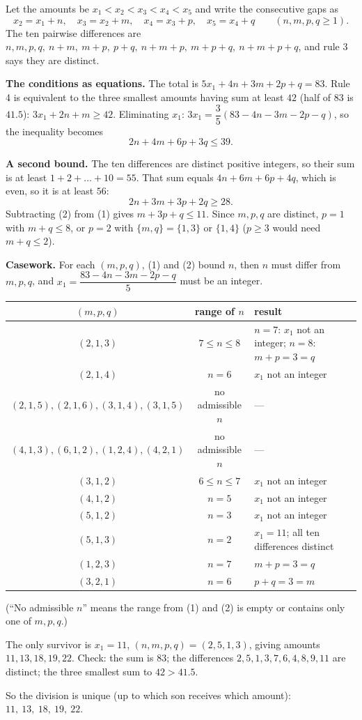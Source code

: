 Let the amounts be $x_1<x_2<x_3<x_4<x_5$ and write the consecutive gaps as
\[
x_2=x_1+n,\quad x_3=x_2+m,\quad x_4=x_3+p,\quad x_5=x_4+q\qquad(n,m,p,q\ge1).
\]
The ten pairwise differences are $n,m,p,q,\ n+m,\ m+p,\ p+q,\ n+m+p,\ m+p+q,\ n+m+p+q$, and rule 3 says they are distinct.

\textbf{The conditions as equations.} The total is $5x_1+4n+3m+2p+q=83$. Rule 4 is equivalent to the three smallest amounts having sum at least $42$ (half of $83$ is $41.5$): $3x_1+2n+m\ge42$. Eliminating $x_1$: $3x_1=\dfrac{3}{5}(83-4n-3m-2p-q)$, so the inequality becomes
\[
2n+4m+6p+3q\le39. \tag{1}
\]

\textbf{A second bound.} The ten differences are distinct positive integers, so their sum is at least $1+2+\dots+10=55$. That sum equals $4n+6m+6p+4q$, which is even, so it is at least $56$:
\[
2n+3m+3p+2q\ge28. \tag{2}
\]
Subtracting (2) from (1) gives $m+3p+q\le11$. Since $m,p,q$ are distinct, $p=1$ with $m+q\le8$, or $p=2$ with $\{m,q\}=\{1,3\}$ or $\{1,4\}$ ($p\ge3$ would need $m+q\le2$).

\textbf{Casework.} For each $(m,p,q)$, (1) and (2) bound $n$, then $n$ must differ from $m,p,q$, and $x_1=\dfrac{83-4n-3m-2p-q}{5}$ must be an integer.
\begin{center}
\begin{tabular}{c|c|l}
$(m,p,q)$ & range of $n$ & result\\\hline
$(2,1,3)$ & $7\le n\le8$ & $n=7$: $x_1$ not an integer; $n=8$: $m+p=3=q$ \\
$(2,1,4)$ & $n=6$ & $x_1$ not an integer\\
$(2,1,5),(2,1,6),(3,1,4),(3,1,5)$ & no admissible $n$ & --- \\
$(4,1,3),(6,1,2),(1,2,4),(4,2,1)$ & no admissible $n$ & --- \\
$(3,1,2)$ & $6\le n\le7$ & $x_1$ not an integer\\
$(4,1,2)$ & $n=5$ & $x_1$ not an integer\\
$(5,1,2)$ & $n=3$ & $x_1$ not an integer\\
$(5,1,3)$ & $n=2$ & $x_1=11$; all ten differences distinct \\
$(1,2,3)$ & $n=7$ & $m+p=3=q$\\
$(3,2,1)$ & $n=6$ & $p+q=3=m$
\end{tabular}
\end{center}
(``No admissible $n$'' means the range from (1) and (2) is empty or contains only one of $m,p,q$.)

The only survivor is $x_1=11$, $(n,m,p,q)=(2,5,1,3)$, giving amounts $11,13,18,19,22$. Check: the sum is $83$; the differences $2,5,1,3,7,6,4,8,9,11$ are distinct; the three smallest sum to $42>41.5$.

So the division is unique (up to which son receives which amount): $\boxed{11,\ 13,\ 18,\ 19,\ 22}$.
